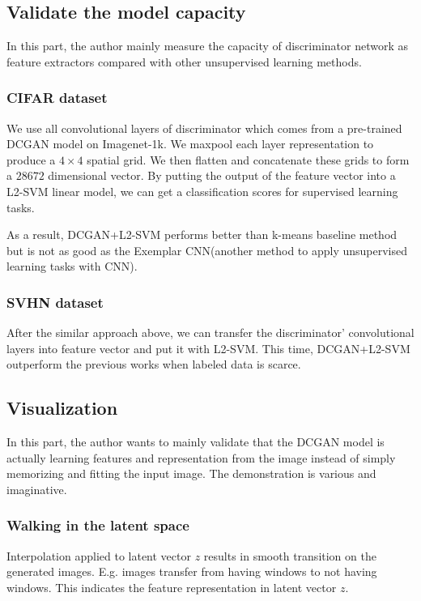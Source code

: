 \documentclass{article} %
\begin{document}
\subsection{Validate the model capacity}

In this part, the author mainly measure the capacity of discriminator network as feature extractors compared with other unsupervised learning methods.

\subsubsection{CIFAR dataset}

We use all convolutional layers of discriminator which comes from a pre-trained DCGAN model on Imagenet-1k. We maxpool each layer representation to produce a $4 \times 4$ spatial grid. We then flatten and concatenate these grids to form a $28672$ dimensional vector. By putting the output of the feature vector into a L2-SVM linear model, we can get a classification scores for supervised learning tasks.

As a result, DCGAN+L2-SVM performs better than k-means baseline method but is not as good as the Exemplar CNN(another method to apply unsupervised learning tasks with CNN).

\subsubsection{SVHN dataset}

After the similar approach above, we can transfer the discriminator' convolutional layers into feature vector and put it with L2-SVM. This time, DCGAN+L2-SVM outperform the previous works when labeled data is scarce.

\subsection{Visualization}

In this part, the author wants to mainly validate that the DCGAN model is actually learning features and representation from the image instead of simply memorizing and fitting the input image. The demonstration is various and imaginative.

\subsubsection{Walking in the latent space}

Interpolation applied to latent vector $z$ results in smooth transition on the generated images. E.g. images transfer from having windows to not having windows. This indicates the feature representation in latent vector $z$.
\end{document}
